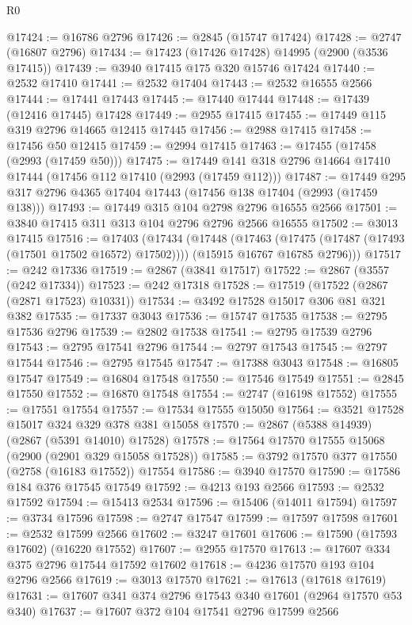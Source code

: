 \begin{lexlean}{R0}
\begin{coremodule}
@17424 := @16786 @2796
@17426 := @2845 (@15747 @17424)
@17428 := @2747 (@16807 @2796)
@17434 := @17423 (@17426 @17428) @14995 (@2900 (@3536 @17415))
@17439 := @3940 @17415 @175 @320 @15746 @17424
@17440 := @2532 @17410
@17441 := @2532 @17404
@17443 := @2532 @16555 @2566
@17444 := @17441 @17443
@17445 := @17440 @17444
@17448 := @17439 (@12416 @17445) @17428
@17449 := @2955 @17415
@17455 := @17449 @115 @319 @2796 @14665 @12415 @17445
@17456 := @2988 @17415
@17458 := @17456 @50 @12415
@17459 := @2994 @17415
@17463 := @17455 (@17458 (@2993 (@17459 @50)))
@17475 := @17449 @141 @318 @2796 @14664 @17410 @17444 (@17456 @112 @17410 (@2993 (@17459 @112)))
@17487 := @17449 @295 @317 @2796 @4365 @17404 @17443 (@17456 @138 @17404 (@2993 (@17459 @138)))
@17493 := @17449 @315 @104 @2798 @2796 @16555 @2566
@17501 := @3840 @17415 @311 @313 @104 @2796 @2796 @2566 @16555
@17502 := @3013 @17415
@17516 := @17403
    (@17434
      (@17448
        (@17463 (@17475 (@17487 (@17493 (@17501 @17502 @16572) @17502))))
        (@15915 @16767 @16785 @2796)))
@17517 := @242 @17336
@17519 := @2867 (@3841 @17517)
@17522 := @2867 (@3557 (@242 @17334))
@17523 := @242 @17318
@17528 := @17519 (@17522 (@2867 (@2871 @17523) @10331))
@17534 := @3492 @17528 @15017 @306 @81 @321 @382
@17535 := @17337 @3043
@17536 := @15747 @17535
@17538 := @2795 @17536 @2796
@17539 := @2802 @17538
@17541 := @2795 @17539 @2796
@17543 := @2795 @17541 @2796
@17544 := @2797 @17543
@17545 := @2797 @17544
@17546 := @2795 @17545
@17547 := @17388 @3043
@17548 := @16805 @17547
@17549 := @16804 @17548
@17550 := @17546 @17549
@17551 := @2845 @17550
@17552 := @16870 @17548
@17554 := @2747 (@16198 @17552)
@17555 := @17551 @17554
@17557 := @17534 @17555 @15050
@17564 := @3521 @17528 @15017 @324 @329 @378 @381 @15058
@17570 := @2867 (@5388 @14939) (@2867 (@5391 @14010) @17528)
@17578 := @17564 @17570 @17555 @15068 (@2900 (@2901 @329 @15058 @17528))
@17585 := @3792 @17570 @377 @17550 (@2758 (@16183 @17552)) @17554
@17586 := @3940 @17570
@17590 := @17586 @184 @376 @17545 @17549
@17592 := @4213 @193 @2566
@17593 := @2532 @17592
@17594 := @15413 @2534
@17596 := @15406 (@14011 @17594)
@17597 := @3734 @17596
@17598 := @2747 @17547
@17599 := @17597 @17598
@17601 := @2532 @17599 @2566
@17602 := @3247 @17601
@17606 := @17590 (@17593 @17602) (@16220 @17552)
@17607 := @2955 @17570
@17613 := @17607 @334 @375 @2796 @17544 @17592 @17602
@17618 := @4236 @17570 @193 @104 @2796 @2566
@17619 := @3013 @17570
@17621 := @17613 (@17618 @17619)
@17631 := @17607 @341 @374 @2796 @17543 @340 @17601 (@2964 @17570 @53 @340)
@17637 := @17607 @372 @104 @17541 @2796 @17599 @2566

\end{coremodule}
\end{lexlean}
